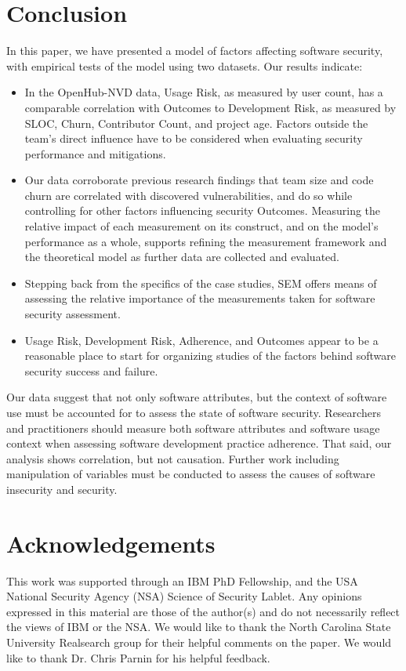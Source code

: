 \section{Conclusion}
\label{sec:conclusion}

In this paper, we have presented a model of factors affecting software security, with empirical tests of the model using two datasets. Our results indicate:
\begin{itemize}
	\item In the OpenHub-NVD data, Usage Risk, as measured by user count, has a comparable correlation with Outcomes to Development Risk, as measured by SLOC, Churn, Contributor Count, and project age. Factors outside the team's direct influence have to be considered when evaluating security performance and mitigations. 
	\item Our data corroborate previous research findings that team size and code churn are correlated with discovered vulnerabilities, and do so while controlling for other factors influencing security Outcomes. Measuring the relative impact of each measurement on its construct, and on the model's performance as a whole, supports refining the measurement framework and the theoretical model as further data are collected and evaluated.
	\item Stepping back from the specifics of the case studies, SEM offers means of assessing the relative importance of the measurements taken for software security assessment.
	\item Usage Risk, Development Risk, Adherence, and Outcomes appear to be a reasonable place to start for organizing studies of the factors behind software security success and failure. 
\end{itemize}

Our data suggest that not only software attributes, but the context of software use must be accounted for to assess the state of software security. Researchers and practitioners should measure both software attributes and software usage context when assessing software development practice adherence. That said, our analysis shows correlation, but not causation. Further work including manipulation of variables must be conducted to assess the causes of software insecurity and security. 

\section{Acknowledgements}

This work was supported through an IBM PhD Fellowship, and the USA National Security Agency (NSA) Science of Security Lablet. Any opinions expressed in this material are those of the author(s) and do not necessarily reflect the views of IBM or the NSA. We would like to thank the North Carolina State University Realsearch group for their helpful comments on the paper. We would like to thank Dr. Chris Parnin for his helpful feedback.
